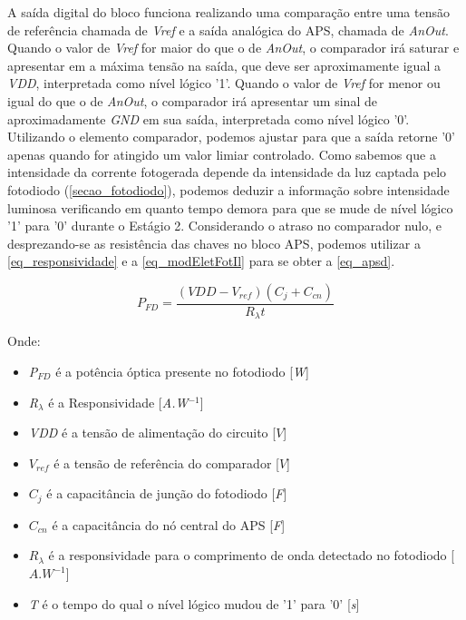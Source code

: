 A sa\'ida digital do bloco funciona realizando uma compara{\c c}\~ao entre uma tens\~ao de refer\^encia chamada de \emph{Vref} e a sa\'ida anal\'ogica do APS, chamada de \emph{AnOut}. Quando o valor de \emph{Vref} for maior do que o de \emph{AnOut}, o comparador ir\'a saturar e apresentar em a m\'axima tens\~ao na sa\'ida, que deve ser aproximamente igual a \emph{VDD}, interpretada como n\'ivel l\'ogico '1'. Quando o valor de \emph{Vref} for menor ou igual do que o de \emph{AnOut}, o comparador ir\'a apresentar um sinal de aproximadamente \emph{GND} em sua sa\'ida, interpretada como n\'ivel l\'ogico '0'.
Utilizando o elemento comparador, podemos ajustar para que a sa\'ida retorne '0' apenas quando for atingido um valor limiar controlado. Como sabemos que a intensidade da corrente fotogerada depende da intensidade da luz captada pelo fotodiodo (\autoref{secao_fotodiodo}), podemos deduzir a informa{\c c}\~ao sobre intensidade luminosa verificando em quanto tempo demora para que se mude de n\'ivel l\'ogico '1' para '0' durante o Est\'agio 2. Considerando o atraso no comparador nulo, e desprezando-se as resistência das chaves no bloco APS, podemos utilizar a \autoref{eq_responsividade} e a \autoref{eq_modEletFotIl} para se obter a \autoref{eq_apsd}.

\begin{equation}
    \label{eq_apsd}
    P_{FD} = \frac{(VDD-V_{ref})(C_{j}+C_{cn})}{R_{\lambda}t}
\end{equation}

Onde:

\begin{itemize}

    \item \emph{P$_{FD}$} \'e a pot\^encia \'optica presente no fotodiodo [\emph{W}]
    \item \emph{R$_\lambda$} \'e a Responsividade [\emph{A.W$^{-1}$}]
    \item \emph{VDD} \'e a tens\~ao de alimenta{\c c}\~ao do circuito [$V$]
    \item \emph{$V_{ref}$} \'e a tens\~ao de refer\^encia do comparador [$V$]
    \item \emph{$C_j$} \'e a capacit\^ancia de jun{\c c}\~ao do fotodiodo [\emph{F}]
    \item \emph{$C_{cn}$} \'e a capacit\^ancia do n\'o central do APS [\emph{F}]
    \item $R_{\lambda}$ \'e a responsividade para o comprimento de onda detectado no fotodiodo [$A.W^{-1}$]
    \item \emph{T} \'e o tempo do qual o n\'ivel l\'ogico mudou de '1' para '0' [\emph{s}]
    
\end{itemize}
